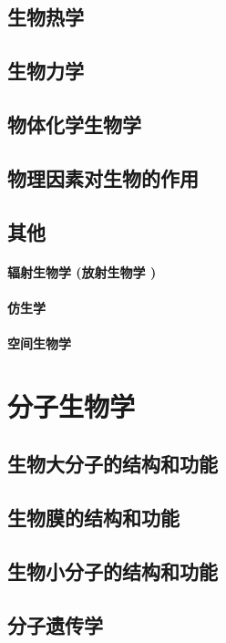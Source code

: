 \documentclass[UTF8]{../NatureUniverse}
\begin{document}
\section{生物热学}
\section{生物力学}
\section{物体化学生物学}
\section{物理因素对生物的作用}
\section{其他}
    \subsubsection{辐射生物学 (放射生物学 )}
    \subsubsection{仿生学}
    \subsubsection{空间生物学}









\chapter{分子生物学}
\section{生物大分子的结构和功能}
\section{生物膜的结构和功能}
\section{生物小分子的结构和功能}
\section{分子遗传学}
\end{document}
